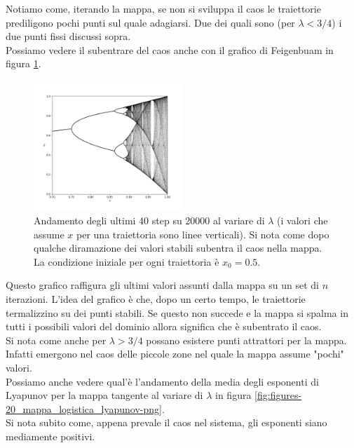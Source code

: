 \noindent
Notiamo come, iterando la mappa, se non si sviluppa il caos le traiettorie prediligono pochi punti sul quale adagiarsi. Due dei quali sono (per $\lambda  < 3 /4$) i due punti fissi discussi sopra. \\
Possiamo vedere il subentrare del caos anche con il grafico di Feigenbuam in figura \ref{fig:figures-20_mappa_logistica_-Feigenbuam-png}.
\begin{figure}[H]
    \centering
    \includegraphics[width=0.5\textwidth]{figures/20_mappa_logistica_ Feigenbuam.png}
    \caption{\scriptsize Andamento degli ultimi 40 step su 20000 al variare di $\lambda$ (i valori che assume $x$ per una traiettoria sono linee verticali). Si nota come dopo qualche diramazione dei valori stabili subentra il caos nella mappa. \\
    La condizione iniziale per ogni traiettoria è $x_0=0.5$.}
    \label{fig:figures-20_mappa_logistica_-Feigenbuam-png}
\end{figure}
\noindent
Questo grafico raffigura gli ultimi valori assunti dalla mappa su un set di $n$ iterazioni. L'idea del grafico è che, dopo un certo tempo, le traiettorie termalizzino su dei punti stabili. Se questo non succede e la mappa si spalma in tutti i possibili valori del dominio allora significa che è subentrato il caos.\\
Si nota come anche per $\lambda > 3 /4$ possano esistere punti attrattori per la mappa. Infatti emergono nel caos delle piccole zone nel quale la mappa assume "pochi" valori. \\
Possiamo anche vedere qual'è l'andamento della media degli esponenti di Lyapunov per la mappa tangente al variare di $\lambda$ in figura \ref{fig:figures-20_mappa_logistica_lyapunov-png}.\\
Si nota subito come, appena prevale il caos nel sistema, gli esponenti siano mediamente positivi. 
